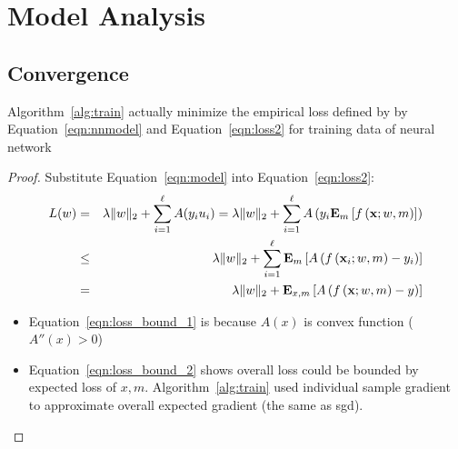 \documentclass[9pt]{article}
\begin{document}
\section{Model Analysis}
\subsection{Convergence}
\label{sec:convergence}
\begin{theorem}
   \label{thm:converge}
   Algorithm~\ref{alg:train} actually minimize the empirical loss defined by
   by Equation~\ref{eqn:nnmodel} and Equation~\ref{eqn:loss2} for training data of neural network
\end{theorem}
\begin{proof}
   Substitute Equation~\ref{eqn:model} into Equation~\ref{eqn:loss2}:
\begin{eqnarray}
   L(w) &=& \lambda\|w\|_2 +\sum_{i=1}^\ell A(y_iu_i) 
   = \lambda\|w\|_2 +\sum_{i=1}^\ell A\left( y_i \mathbf{E}_m\left[f\left({\bf x};w,m\right)\right]\right) \nonumber \\
   &\leq &
   \lambda\|w\|_2 +\sum_{i=1}^\ell \mathbf{E}_m\left[A\left( f\left({\bf x}_i;w,m\right)-y_i \right)\right] \label{eqn:loss_bound_1} \\
   &=&
   \lambda\|w\|_2 +\mathbf{E}_{x,m}\left[A\left( f\left({\bf x};w,m\right)-y \right) \right]\label{eqn:loss_bound_2} \\
\end{eqnarray}
\begin{itemize}
   \item Equation~\ref{eqn:loss_bound_1} is because $A(x)$ is convex function ($A''(x)>0$)
   \item Equation~\ref{eqn:loss_bound_2} shows overall loss could be bounded by expected loss
       of $x,m$. Algorithm~\ref{alg:train} used individual sample gradient 
       to approximate overall expected gradient (the same as sgd).
   \end{itemize}
\end{proof}
\end{document}
